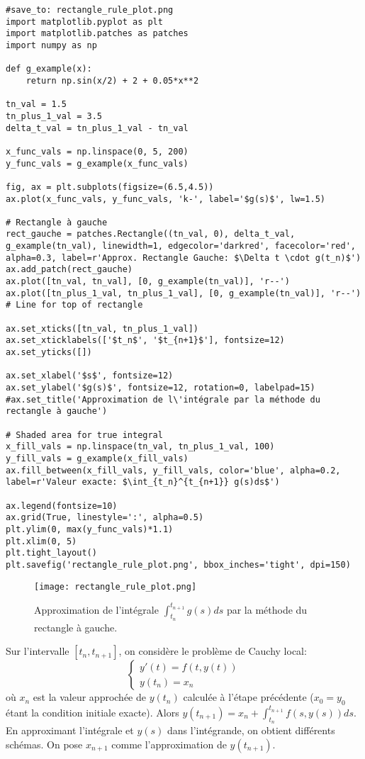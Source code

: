 \begin{verbatim}
#save_to: rectangle_rule_plot.png
import matplotlib.pyplot as plt
import matplotlib.patches as patches
import numpy as np

def g_example(x):
    return np.sin(x/2) + 2 + 0.05*x**2

tn_val = 1.5
tn_plus_1_val = 3.5
delta_t_val = tn_plus_1_val - tn_val

x_func_vals = np.linspace(0, 5, 200)
y_func_vals = g_example(x_func_vals)

fig, ax = plt.subplots(figsize=(6.5,4.5))
ax.plot(x_func_vals, y_func_vals, 'k-', label='$g(s)$', lw=1.5)

# Rectangle à gauche
rect_gauche = patches.Rectangle((tn_val, 0), delta_t_val, g_example(tn_val), linewidth=1, edgecolor='darkred', facecolor='red', alpha=0.3, label=r'Approx. Rectangle Gauche: $\Delta t \cdot g(t_n)$')
ax.add_patch(rect_gauche)
ax.plot([tn_val, tn_val], [0, g_example(tn_val)], 'r--')
ax.plot([tn_plus_1_val, tn_plus_1_val], [0, g_example(tn_val)], 'r--') # Line for top of rectangle

ax.set_xticks([tn_val, tn_plus_1_val])
ax.set_xticklabels(['$t_n$', '$t_{n+1}$'], fontsize=12)
ax.set_yticks([])

ax.set_xlabel('$s$', fontsize=12)
ax.set_ylabel('$g(s)$', fontsize=12, rotation=0, labelpad=15)
#ax.set_title('Approximation de l\'intégrale par la méthode du rectangle à gauche')

# Shaded area for true integral
x_fill_vals = np.linspace(tn_val, tn_plus_1_val, 100)
y_fill_vals = g_example(x_fill_vals)
ax.fill_between(x_fill_vals, y_fill_vals, color='blue', alpha=0.2, label=r'Valeur exacte: $\int_{t_n}^{t_{n+1}} g(s)ds$')

ax.legend(fontsize=10)
ax.grid(True, linestyle=':', alpha=0.5)
plt.ylim(0, max(y_func_vals)*1.1)
plt.xlim(0, 5)
plt.tight_layout()
plt.savefig('rectangle_rule_plot.png', bbox_inches='tight', dpi=150)
\end{verbatim}
\begin{figure}[h]
\centering
\texttt{[image: rectangle\_rule\_plot.png]}
\caption{Approximation de l'intégrale $\int_{t_n}^{t_{n+1}} g(s)ds$ par la méthode du rectangle à gauche.}
\label{fig:rectangle_rule_plot}
\end{figure}

Sur l'intervalle $[t_n, t_{n+1}]$, on considère le problème de Cauchy local:
\[ \begin{cases} y'(t) = f(t, y(t)) \\ y(t_n) = x_n \end{cases} \]
où $x_n$ est la valeur approchée de $y(t_n)$ calculée à l'étape précédente ($x_0 = y_0$ étant la condition initiale exacte).
Alors $y(t_{n+1}) = x_n + \int_{t_n}^{t_{n+1}} f(s, y(s)) ds$.
En approximant l'intégrale et $y(s)$ dans l'intégrande, on obtient différents schémas. On pose $x_{n+1}$ comme l'approximation de $y(t_{n+1})$.

